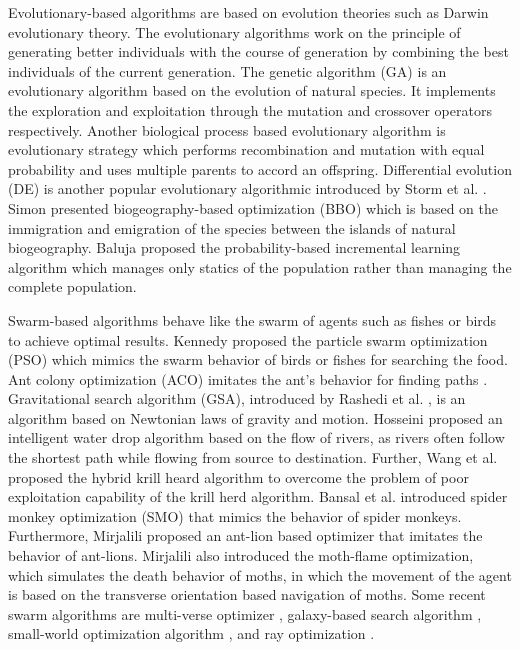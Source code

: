 \begin{itemize}
Evolutionary-based algorithms are based on evolution theories such as Darwin evolutionary theory. The evolutionary algorithms work on the principle of generating better individuals with the course of generation by combining the best individuals of the current generation. The genetic algorithm (GA) \cite{maulik2000genetic} is an evolutionary algorithm based on the evolution of natural species. It implements the exploration and exploitation through the mutation and crossover operators respectively. Another biological process based evolutionary algorithm is evolutionary strategy \cite{babu1994clustering} which performs recombination and mutation with equal probability and uses multiple parents to accord an offspring. Differential evolution (DE) is another popular evolutionary algorithmic introduced by Storm et al. \cite{storn1997}. Simon \cite{Simon2008} presented biogeography-based optimization (BBO) which is based on the immigration and emigration of the species between the islands of natural biogeography. Baluja \cite{dasgupta2013evolutionary} proposed the probability-based incremental learning algorithm which manages only statics of the population rather than managing the complete population.

Swarm-based algorithms behave like the swarm of agents such as fishes or birds to achieve optimal results. Kennedy \cite{kennedy2011} proposed the particle swarm optimization (PSO) which mimics the swarm behavior of birds or fishes for searching the food. Ant colony optimization (ACO) imitates the ant's behavior for finding paths \cite{dorigo2006}. Gravitational search algorithm (GSA), introduced by Rashedi et al. \cite{rashedi2009}, is an algorithm based on Newtonian laws of gravity and motion. Hosseini \cite{shah2009} proposed an intelligent water drop algorithm based on the flow of rivers, as rivers often follow the shortest path while flowing from source to destination. Further, Wang et al. \cite{wang2014} proposed the hybrid krill heard algorithm to overcome the problem of poor exploitation capability of the krill herd algorithm.  Bansal et al. \cite{Bansal2014} introduced spider monkey optimization (SMO) that mimics the behavior of spider monkeys. Furthermore, Mirjalili \cite{mirjalili2015} proposed an ant-lion based optimizer that imitates the behavior of ant-lions. Mirjalili \cite{mirjalili2015a} also introduced the moth-flame optimization, which simulates the death behavior of moths, in which the movement of the agent is based on the transverse orientation based navigation of moths. Some recent swarm algorithms are multi-verse optimizer \cite{mirjalili2016multi}, galaxy-based search algorithm \cite{shah2011principal}, small-world optimization algorithm \cite{du2006}, and ray optimization \cite{kaveh2012new}.


\end{itemize}
